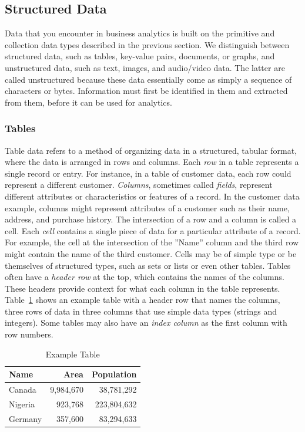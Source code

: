\FloatBarrier
\subsection{Structured Data}

Data that you encounter in business analytics is built on the primitive and collection data types described in the previous section. We distinguish between structured data, such as tables, key-value pairs, documents, or graphs, and unstructured data, such as text, images, and audio/video data. The latter are called unstructured because these data essentially come as simply a sequence of characters or bytes. Information must first be identified in them and extracted from them, before it can be used for analytics. 

\subsubsection*{Tables}

Table data refers to a method of organizing data in a structured, tabular format, where the data is arranged in rows and columns. Each \emph{row} in a table represents a single record or entry. For instance, in a table of customer data, each row could represent a different customer. \emph{Columns}, sometimes called \emph{fields}, represent different attributes or characteristics or features of a record. In the customer data example, columns might represent attributes of a customer such as their name, address, and purchase history. The intersection of a row and a column is called a cell. Each \emph{cell} contains a single piece of data for a particular attribute of a record. For example, the cell at the intersection of the ''Name'' column and the third row might contain the name of the third customer. Cells may be of simple type or be themselves of structured types, such as sets or lists or even other tables. Tables often have a \emph{header row} at the top, which contains the names of the columns. These headers provide context for what each column in the table represents. Table~\ref{tab:exampletable} shows an example table with a header row that names the columns, three rows of data in three columns that use simple data types (strings and integers). Some tables may also have an \emph{index column} as the first column with row numbers. 

\begin{table}[b]
\centering
\renewcommand{\arraystretch}{1.25}

\begin{tabular}{l|r|r} \hline
\textbf{Name} & \textbf{Area} & \textbf{Population} \\ \hline
Canada & 9,984,670 & 38,781,292  \\
Nigeria & 923,768 & 223,804,632 \\
Germany & 357,600 & 83,294,633 \\ \hline
\end{tabular}
\caption{Example Table}
\label{tab:exampletable}
\end{table}

